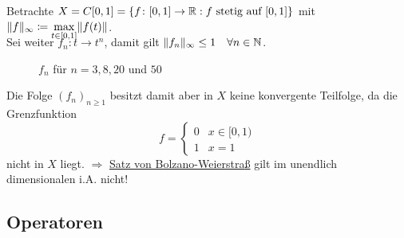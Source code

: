 \begin{beispiel}
	Betrachte $X = C[0, 1] = \{ f \colon [0, 1] \rightarrow \mathbb{R}: f \text{ stetig auf } [0, 1] \} $ mit $\| f \|_{\infty} \coloneqq  \smash{\displaystyle\max_{t \in [0, 1]}}  \| f(t) \|$. \\ 
	Sei weiter $f_{n} \colon t \rightarrow t^{n}$, damit gilt $\| f_{n} \|_{\infty} \leq 1 \quad \forall n \in \mathbb{N}$.	
	\begin{figure}[H]	
		\begin{center}					
			\caption{$f_{n}$ für $n = 3, 8, 20$ und $50$}
		\end{center}
	\end{figure}					
	Die Folge $(f_{n})_{n \geq 1}$ besitzt damit aber in $X$ keine konvergente Teilfolge, da die Grenzfunktion
		\[ f = \begin{cases} 0 & x \in [0, 1) \\ 1 & x = 1 \end{cases} \]
	nicht in $X$ liegt. $ \Rightarrow $ \hyperref[satz:1.1-BolzanoWeierstrass]{Satz von Bolzano-Weierstra{\ss}} gilt im unendlich dimensionalen i.A. nicht!
\end{beispiel}


\subsection*{Operatoren}



